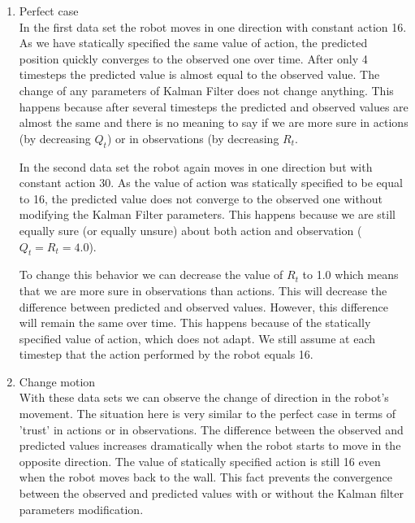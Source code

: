 \documentclass{article}
\begin{document}
\begin{enumerate}
  \item Perfect case\\
    In the first data set the robot moves in one
    direction with constant action 16. As we have statically
    specified the same value of action, the predicted position quickly
    converges to the observed one over time. After only 4 timesteps the
    predicted value is almost equal to the observed value. The change of
    any parameters of Kalman Filter does not change anything. This
    happens because after several timesteps the predicted and observed
    values are almost the same and there is no meaning to say if we are
    more sure in actions (by decreasing $Q_t$) or in observations (by
    decreasing $R_t$.
    
    In the second data set the robot again moves in one direction but
    with constant action 30. As the value of action was statically
    specified to be equal to 16, the predicted value does not converge
    to the observed one without modifying the Kalman Filter parameters.
    This happens because we are still equally sure (or equally unsure)
    about both action and observation ($Q_t = R_t = 4.0$).
    
    To change this behavior we can decrease the value of $R_t$ to 1.0 which
    means that we are more sure in observations than actions. This will
    decrease the difference between predicted and observed values.
    However, this difference will remain the same over time. This
    happens because of the statically specified value of action, which
    does not adapt. We still assume at each timestep that the action
    performed by the robot equals 16.
    
  \item Change motion\\
    With these data sets we can observe the change of direction in the
    robot's movement. The situation here is very similar to the perfect
    case in terms of 'trust' in actions or in observations. The
    difference between the observed and predicted values increases
    dramatically when the robot starts to move in the opposite
    direction. The value of statically specified action is still 16 even
    when the robot moves back to the wall. This fact prevents the
    convergence between the observed and predicted values with or
    without the Kalman filter parameters modification.
    
\end{enumerate}
\end{document}
